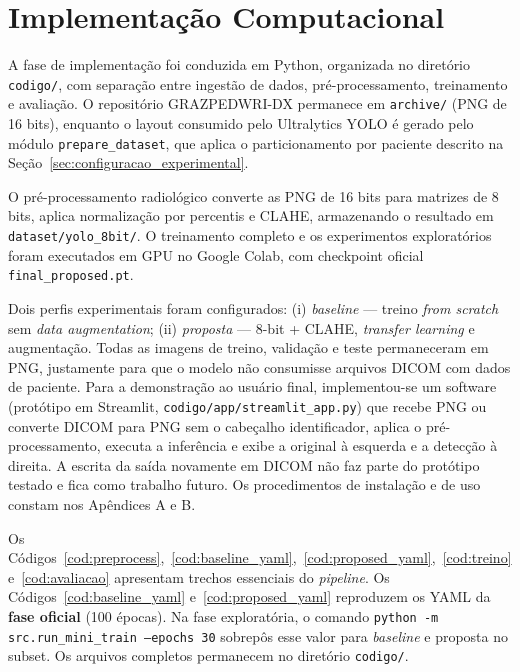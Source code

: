 \documentclass[12pt,oneside,a4paper,chapter=TITLE,section=TITLE,sumario=tradicional]{abntex2}
\begin{document}
\section{Implementação Computacional}
\label{sec:implementacao_computacional}

A fase de implementação foi conduzida em Python, organizada no diretório \texttt{codigo/}, com separação entre ingestão de dados, pré-processamento, treinamento e avaliação. O repositório GRAZPEDWRI-DX permanece em \texttt{archive/} (PNG de 16 bits), enquanto o layout consumido pelo Ultralytics YOLO é gerado pelo módulo \texttt{prepare\_dataset}, que aplica o particionamento por paciente descrito na Seção~\ref{sec:configuracao_experimental}.

O pré-processamento radiológico converte as PNG de 16 bits para matrizes de 8 bits, aplica normalização por percentis e CLAHE, armazenando o resultado em \texttt{dataset/yolo\_8bit/}. O treinamento completo e os experimentos exploratórios foram executados em GPU no Google Colab, com checkpoint oficial \texttt{final\_proposed.pt}.

Dois perfis experimentais foram configurados: (i) \textit{baseline} --- treino \textit{from scratch} sem \textit{data augmentation}; (ii) \textit{proposta} --- 8-bit + CLAHE, \textit{transfer learning} e augmentação. Todas as imagens de treino, validação e teste permaneceram em PNG, justamente para que o modelo não consumisse arquivos DICOM com dados de paciente. Para a demonstração ao usuário final, implementou-se um software (protótipo em Streamlit, \texttt{codigo/app/streamlit\_app.py}) que recebe PNG ou converte DICOM para PNG sem o cabeçalho identificador, aplica o pré-processamento, executa a inferência e exibe a original à esquerda e a detecção à direita. A escrita da saída novamente em DICOM não faz parte do protótipo testado e fica como trabalho futuro. Os procedimentos de instalação e de uso constam nos Apêndices A e B.

Os Códigos~\ref{cod:preprocess},~\ref{cod:baseline_yaml},~\ref{cod:proposed_yaml},~\ref{cod:treino} e~\ref{cod:avaliacao} apresentam trechos essenciais do \textit{pipeline}. Os Códigos~\ref{cod:baseline_yaml} e~\ref{cod:proposed_yaml} reproduzem os YAML da \textbf{fase oficial} (100 épocas). Na fase exploratória, o comando \texttt{python -m src.run\_mini\_train --epochs 30} sobrepôs esse valor para \textit{baseline} e proposta no subset. Os arquivos completos permanecem no diretório \texttt{codigo/}.

\begin{codigo}[htb]
\caption{PRÉ-PROCESSAMENTO COM NORMALIZAÇÃO E CLAHE}
\label{cod:preprocess}

\end{codigo}
\end{document}
